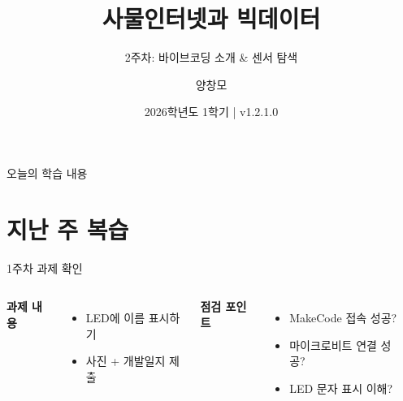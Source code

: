 \documentclass[aspectratio=169]{beamer}
\title{사물인터넷과 빅데이터}
\subtitle{2주차: 바이브코딩 소개 \& 센서 탐색}
\author{양창모}
\institute{청주교육대학교 컴퓨터교육과}
\date{2026학년도 1학기 | v1.2.1.0}
\begin{document}
\begin{frame}
  \titlepage
\end{frame}

\begin{frame}{오늘의 학습 내용}
  \tableofcontents
\end{frame}

\section{지난 주 복습}

\begin{frame}{1주차 과제 확인}
  \begin{columns}
    \textbf{과제 내용}
    \begin{itemize}
      \item LED에 이름 표시하기
      \item 사진 + 개발일지 제출
    \end{itemize}
    
    \vspace{1em}
    \textbf{점검 포인트}
    \begin{itemize}
      \item MakeCode 접속 성공?
      \item 마이크로비트 연결 성공?
      \item LED 문자 표시 이해?
    \end{itemize}
    
    \begin{center}
    \end{center}
  \end{columns}
\end{frame}
\end{document}
